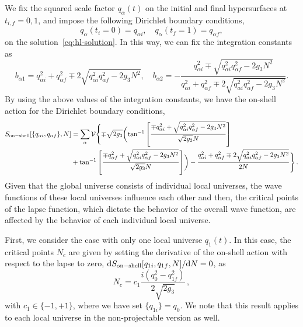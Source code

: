 \documentclass[superscriptaddress,aps,preprintnumbers,nofootinbib]{revtex4-2}
\begin{document}
We fix the squared scale factor $q_{\alpha}(t)$ on the initial and final hypersurfaces at $t_{i,f}=0,1$, and impose the following Dirichlet boundary conditions, 
\begin{equation}\label{eq:Dirichlet-boundary}
q_{\alpha}(t_{i}=0)=q_{\alpha i}, \quad q_{\alpha}(t_{f}=1)=q_{\alpha f},
\end{equation}
on the solution~\eqref{eq:hl-solution}. In this way, we can fix the integration constants as
\begin{equation}
b_{\alpha 1}=q_{\alpha i}^2+q_{\alpha f}^2 \mp 2 \sqrt{q_{\alpha i}^2q_{\alpha f}^2-2g_{3}N^2}, 
\quad b_{\alpha 2}=-\frac{q_{\alpha i}^2\mp \sqrt{q_{\alpha i}^2q_{\alpha f}^2-2g_{3}N^2}}{q_{\alpha i}^2+q_{\alpha f}^2\mp 2\sqrt{q_{\alpha i}^2q_{\alpha f}^2
-2g_{3} N^2}}.
\end{equation}
By using the above values of the integration constants, we have the on-shell action for the Dirichlet boundary conditions, 
\begin{align}\label{eq:on-shell-Dirichlet}
\begin{split}
S_{\rm on-shell}[\{q_{\alpha i},q_{\alpha f}\}, N]&
=\sum_{\alpha}{\cal V}\Biggl\{
\mp \sqrt{2g_{3}} \biggl(\tan ^{-1}\left[\frac{\mp q_{\alpha i}^2+\sqrt{q_{\alpha i}^2q_{\alpha f}^2-2g_{3}N^2}}{\sqrt{2g_{3}} N}\right]\\
&+\tan ^{-1}\left[\frac{\mp q_{\alpha f}^2+\sqrt{q_{\alpha i}^2q_{\alpha f}^2-2g_{3}N^2}}{\sqrt{2g_{3}} N}\right]\biggr)-\frac{q_{\alpha i}^2+q_{\alpha f}^2\mp 2 \sqrt{q_{\alpha i}^2q_{\alpha f}^2-2g_{3}N^2}}{2 N}\Biggr\}\,. 
\end{split}
\end{align}
Given that the global universe consists of individual local universes, the wave functions of these local universes influence each other and then, the critical points of the lapse function, which dictate the behavior of the overall wave function, are affected by the behavior of each individual local universe.



First, we consider the case with only one local universe $q_{1}(t)$. In this case, the critical points $N_c$ are given by setting the derivative of the on-shell action with respect to the lapse to zero, $\mathrm{d} S_{\rm on-shell} [q_{1 i},q_{1 f}, N]/\mathrm{d} N =0$, as
\begin{equation}
N_c=c_{1}\frac{i \left(q_0^2-q_{1 f}^2\right)}{2 \sqrt{2 g_3}}\,, 
\end{equation}
with $c_{1} \in \{-1 , +1\}$, where we have set $\{q_{1 i}\}=q_0$. We note that this result applies to each local universe in the non-projectable version as well. 
\end{document}
